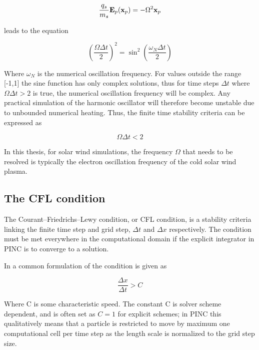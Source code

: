 \begin{equation}\label{eq:harmonicOscillator}
    \frac{q_s}{m_s} \vb{E}_p(\vb{x}_p) = - \Omega^2 \vb{x}_p
\end{equation}

leads to the equation 

\begin{equation}
    \left(\frac{\Omega \Delta t}{2} \right)^2 = \sin^2{\left(\frac{\omega_N \Delta t}{2}\right)}
\end{equation}

Where $\omega_N$ is the numerical oscillation frequency. For values outside the range [-1,1] the sine function has only complex solutions, thus for time steps $\Delta t$ where  $\Omega \Delta t > 2$ is true, the numerical oscillation frequency will be complex. Any practical simulation of the harmonic oscillator will therefore become unstable due to unbounded numerical heating. Thus, the finite time stability criteria can be expressed as

\begin{equation}
    \Omega \Delta t < 2
\end{equation}

In this thesis, for solar wind simulations, the frequency $\Omega$ that needs to be resolved is typically the electron oscillation frequency of the cold solar wind plasma. 


\subsection{The CFL condition}
The Courant–Friedrichs–Lewy condition, or CFL condition, is a stability criteria linking the finite time step and grid step, $\Delta t$ and $\Delta x$ respectively. The condition must be met everywhere in the computational domain if the explicit integrator in PINC is to converge to a solution.

In  a common formulation of the condition is given as

\begin{equation}
    \frac{\Delta x}{\Delta t} > C
\end{equation}

Where C is some characteristic speed. The constant C is solver scheme dependent, and is often set as $C = 1$ for explicit schemes; in PINC this qualitatively means that a particle is restricted to move by maximum one computational cell per time step as the length scale is normalized to the grid step size.

